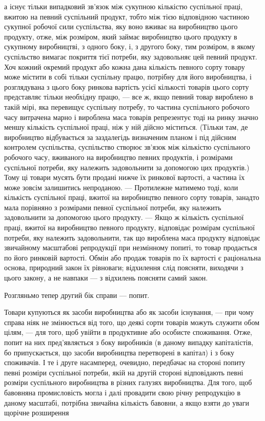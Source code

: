 \parcont{}  %
а існує тільки випадковий зв’язок між сукупною кількістю суспільної
праці, вжитою на певний суспільний продукт, тобто між
тією відповідною частиною сукупної робочої сили суспільства,
яку воно вживає на виробництво цього продукту, отже, між
розміром, який займає виробництво цього продукту в сукупному
виробництві, з одного боку, і, з другого боку, тим розміром, в якому
суспільство вимагає покриття тієї потреби, яку задовольняє цей
певний продукт. Хоч кожний окремий продукт або кожна дана кількість
певного сорту товару може містити в собі тільки суспільну
працю, потрібну для його виробництва, і розглядувана з цього
боку ринкова вартість усієї кількості товарів цього сорту представляє
тільки необхідну працю, — все ж, якщо певний товар
вироблено в такій мірі, яка перевищує суспільну потребу, то
частина суспільного робочого часу витрачена марно і вироблена
маса товарів репрезентує тоді на ринку значно меншу
кількість суспільної праці, ніж у ній дійсно міститься. (Тільки
там, де виробництво відбувається за заздалегідь визначеним
планом і під дійсним контролем суспільства, суспільство створює
зв’язок між кількістю суспільного робочого часу, вживаного на виробництво
певних продуктів, і розмірами суспільної потреби, яку
належить задовольнити за допомогою цих продуктів.) Тому ці товари
мусять бути продані нижче їх ринкової вартості, а частина їх
може зовсім залишитись непроданою. — Протилежне матимемо тоді,
коли кількість суспільної праці, вжитої на виробництво певного
сорту товарів, занадто мала порівняно з розмірами певної суспільної
потреби, яку належить задовольнити за допомогою цього продукту.
— Якщо ж кількість суспільної праці, вжитої на виробництво
певного продукту, відповідає розмірам суспільної потреби, яку
належить задовольнити, так що вироблена маса продукту відповідає
звичайному масштабові репродукції при незмінному
попиті, то товар продається по його ринковій вартості. Обмін
або продаж товарів по їх вартості є раціональна основа, природний
закон їх рівноваги; відхилення слід поясняти, виходячи
з цього закону, а не навпаки — з відхилень поясняти самий закон.

Розгляньмо тепер другий бік справи — попит.

Товари купуються як засоби виробництва або як засоби
існування, — при чому справа ніяк не змінюється від того, що
деякі сорти товарів можуть служити обом цілям, — для того,
щоб увійти в продуктивне або особисте споживання. Отже,
попит на них пред’являється з боку виробників (в даному випадку
капіталістів, бо припускається, що засоби виробництва
перетворені в капітал) і з боку споживачів. І те і друге насамперед,
очевидно, передбачає на стороні попиту певні розміри
суспільної потреби, якій на другій стороні відповідають певні
розміри суспільного виробництва в різних галузях виробництва.
Для того, щоб бавовняна промисловість могла і далі провадити
свою річну репродукцію в даному масштабі, потрібна звичайна
кількість бавовни, а якщо взяти до уваги щорічне розширення
\parbreak{}  %
